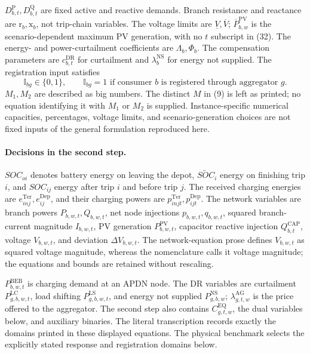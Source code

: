 \documentclass{article}
\begin{document}
\(D^{\mathrm P}_{b,t},D^{\mathrm Q}_{b,t}\) are fixed active and reactive demands. Branch resistance and reactance are \(\mathrm r_b,\mathrm x_b\), not trip-chain variables. The voltage limits are \(\underline V,\overline V\); \(\overline P^{\mathrm{PV}}_{b,w}\) is the scenario-dependent maximum PV generation, with no \(t\) subscript in (32). The energy- and power-curtailment coefficients are \(\Lambda_b,\Phi_b\). The compensation parameters are \(c^{\mathrm{DR}}_{b,t}\) for curtailment and \(\lambda^{\mathrm{NS}}_b\) for energy not supplied. The registration input satisfies
\[
\mathbb I_{bg}\in\{0,1\},\qquad
\mathbb I_{bg}=1\text{ if consumer }b\text{ is registered through aggregator }g.
\]
\(M_1,M_2\) are described as big numbers. The distinct \(M\) in (9) is left as printed; no equation identifying it with \(M_1\) or \(M_2\) is supplied. Instance-specific numerical capacities, percentages, voltage limits, and scenario-generation choices are not fixed inputs of the general formulation reproduced here.

\paragraph{Decisions in the second step.}
\(SOC_{oi}\) denotes battery energy on leaving the depot, \(\widetilde{SOC}_i\) energy on finishing trip \(i\), and \(SOC_{ij}\) energy after trip \(i\) and before trip \(j\). The received charging energies are \(e^{\mathrm{Ter}}_{inj},e^{\mathrm{Dep}}_{ij}\), and their charging powers are \(p^{\mathrm{Ter}}_{injt},p^{\mathrm{Dep}}_{ijt}\). The network variables are branch powers \(P_{b,w,t},Q_{b,w,t}\), net node injections \(p_{b,w,t},q_{b,w,t}\), squared branch-current magnitude \(I_{b,w,t}\), PV generation \(P^{\mathrm{PV}}_{b,w,t}\), capacitor reactive injection \(Q^{\mathrm{CAP}}_{b,t}\), voltage \(V_{b,w,t}\), and deviation \(\Delta V_{b,w,t}\). The network-equation prose defines \(V_{b,w,t}\) as squared voltage magnitude, whereas the nomenclature calls it voltage magnitude; the equations and bounds are retained without rescaling.

\(P^{\mathrm{BEB}}_{b,w,t}\) is charging demand at an APDN node. The DR variables are curtailment \(P^{\mathrm{LC}}_{g,b,w,t}\), load shifting \(P^{\mathrm{LS}}_{g,b,w,t}\), and energy not supplied \(P^{\mathrm{NS}}_{g,b,w}\); \(\lambda^{\mathrm{AG}}_{g,t,w}\) is the price offered to the aggregator. The second step also contains \(C^{\mathrm{EQ}}_{g,t,w}\), the dual variables below, and auxiliary binaries. The literal transcription records exactly the domains printed in these displayed equations. The physical benchmark selects the explicitly stated response and registration domains below.
\end{document}
